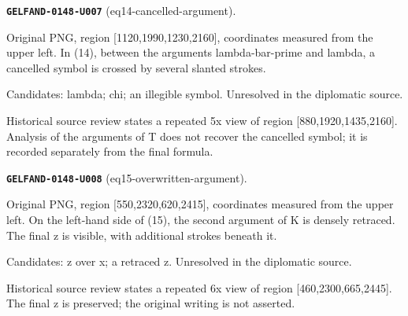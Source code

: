 \documentclass[11pt]{article}
\theoremstyle{definition}
\theoremstyle{remark}
\begin{document}
\noindent\leavevmode{}\label{GELFAND-P001360:eq14-cancelled-argument:note}\textbf{\texttt{GELFAND-0148-U007}} (eq14-cancelled-argument).\par\nopagebreak[4]
Original PNG, region [1120,1990,1230,2160], coordinates measured from the upper left. In (14), between the arguments lambda-bar-prime and lambda, a cancelled symbol is crossed by several slanted strokes.\par
Candidates: lambda; chi; an illegible symbol. Unresolved in the diplomatic source.\par
Historical source review states a repeated 5x view of region [880,1920,1435,2160]. Analysis of the arguments of T does not recover the cancelled symbol; it is recorded separately from the final formula.\par\medskip
\noindent\leavevmode{}\label{GELFAND-P001360:eq15-overwritten-argument:note}\textbf{\texttt{GELFAND-0148-U008}} (eq15-overwritten-argument).\par\nopagebreak[4]
Original PNG, region [550,2320,620,2415], coordinates measured from the upper left. On the left-hand side of (15), the second argument of K is densely retraced. The final z is visible, with additional strokes beneath it.\par
Candidates: z over x; a retraced z. Unresolved in the diplomatic source.\par
Historical source review states a repeated 6x view of region [460,2300,665,2445]. The final z is preserved; the original writing is not asserted.\par\medskip
\end{document}
